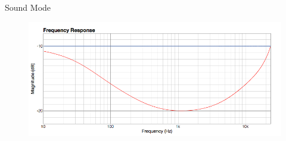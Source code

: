 \documentclass{beamer}
\begin{document}
\begin{frame}[t]{Sound Mode}
\begin{figure}[b]
\includegraphics[height=0.37\textwidth]{figure/soundmode.png}
\end{figure}

\end{frame}


\end{document}
